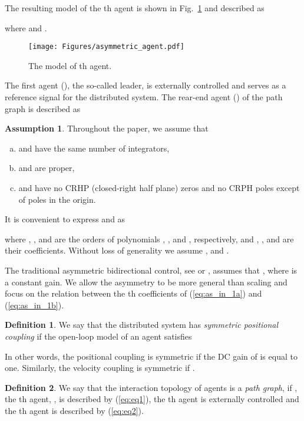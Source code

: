 \documentclass[10pt,twocolumn,twoside]{IEEEtran}
\theoremstyle{definition}
\newtheorem{defn}{Definition}
\newtheorem{assumption}{Assumption}
\newcommand{\revA}{Black}
\begin{document}
The resulting model of the th agent is shown in Fig.~\ref{fig:asymmetric_agent} and described as

where  and .

\begin{figure}[ht]
 \centering
  \texttt{[image: Figures/asymmetric\_agent.pdf]}
  \caption{The model of th agent.}
  \label{fig:asymmetric_agent}
\end{figure}

The first agent (), the so-called leader, is externally controlled and serves as a reference signal for the distributed system. The rear-end agent () of the path graph is described as


\begin{assumption}\label{assum:1}
Throughout the paper, we assume that
  \begin{enumerate}[(a)]
    \item  and  have the same number of  integrators,
    \item  and  are proper,
    \item  and  have no CRHP (closed-right half plane) zeros and no CRPH poles except of  poles in the origin.
  \end{enumerate}
\end{assumption}


It is convenient to express  and  as

where , ,  and  are the orders of polynomials , ,  and , respectively, and , ,  and  are their coefficients. Without loss of generality we assume ,  and .




The traditional asymmetric bidirectional control, see \cite{Barooah2009} or \cite{Tangerman2012}, assumes that , where  is a constant gain. We allow the asymmetry to be more general than scaling and focus on the relation between the th coefficients of (\ref{eq:as_in_1a}) and (\ref{eq:as_in_1b}). 

\begin{defn}\label{def:pos_coupling}
We say that the distributed system has \emph{symmetric positional coupling} if the open-loop model of an agent satisfies
  
\end{defn}
In other words, the positional coupling is symmetric if the DC gain of  is equal to one. Similarly, the velocity coupling is symmetric if .

\begin{defn}\label{def:path_graph}
{\color{\revA}
We say that the interaction topology of  agents is a \emph{path graph}, if , the th agent, , is described by (\ref{eq:eq1}), the th agent is externally controlled and the th agent is described by (\ref{eq:eq2}).}
\end{defn}
\end{document}
